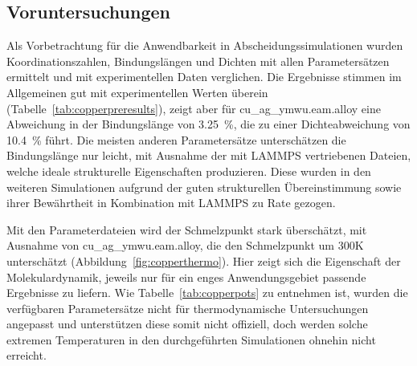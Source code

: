 \subsection{Voruntersuchungen}

Als Vorbetrachtung für die Anwendbarkeit in Abscheidungssimulationen wurden Koordinationszahlen, Bindungslängen und Dichten mit allen Parametersätzen ermittelt und mit experimentellen Daten verglichen.
Die Ergebnisse stimmen im Allgemeinen gut mit experimentellen Werten überein (Tabelle~\ref{tab:copperpreresults}), zeigt aber für cu\_ag\_ymwu.eam.alloy eine Abweichung in der Bindungslänge von \SI{3.25}{\percent}, die zu einer Dichteabweichung von \SI{10.4}{\percent} führt.
Die meisten anderen Parametersätze unterschätzen die Bindungslänge nur leicht, mit Ausnahme der mit LAMMPS vertriebenen Dateien, welche ideale strukturelle Eigenschaften produzieren.
Diese wurden in den weiteren Simulationen aufgrund der guten strukturellen Übereinstimmung sowie ihrer Bewährtheit in Kombination mit LAMMPS zu Rate gezogen.

Mit den Parameterdateien wird der Schmelzpunkt stark überschätzt, mit Ausnahme von cu\_ag\_ymwu.eam.alloy, die den Schmelzpunkt um 300K unterschätzt (Abbildung~\ref{fig:copperthermo}).
Hier zeigt sich die Eigenschaft der Molekulardynamik, jeweils nur für ein enges Anwendungsgebiet passende Ergebnisse zu liefern.
Wie Tabelle~\ref{tab:copperpots} zu entnehmen ist, wurden die verfügbaren Parametersätze nicht für thermodynamische Untersuchungen angepasst und unterstützen diese somit nicht offiziell, doch werden solche extremen Temperaturen in den durchgeführten Simulationen ohnehin nicht erreicht.

